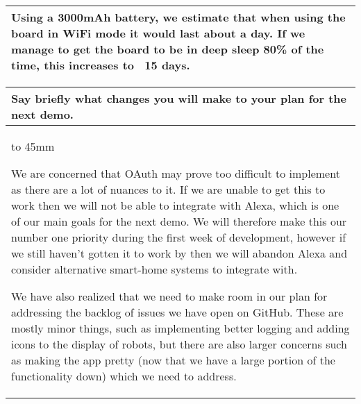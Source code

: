 \documentclass[a4paper]{article}
\newcommand{\colWidth}{141mm}
\begin{document}
\begin{center}
\begin{tabular}{|p{\colWidth}|}
{		Using a 3000mAh battery, we estimate that when using the board in WiFi mode it would last about a day.
		If we manage to get the board to be in deep sleep 80\% of the time, this increases to ~15 days.
  }
  \\
  \hline
\end{tabular}
\vskip 5mm


\begin{tabular}{|p{\colWidth}|}
	\hline
	\cellcolor{blue!25}\large
	\textbf{Say briefly what changes you will make to your plan for the next demo.}
	\\ \hline
	\vtop to 45mm{
		We are concerned that OAuth may prove too difficult to implement as there are a lot of nuances to it.
		If we are unable to get this to work then we will not be able to integrate with Alexa, which is one of
		our main goals for the next demo. We will therefore make this our number one priority during the first
		week of development, however if we still haven't gotten it to work by then we will abandon Alexa and
		consider alternative smart-home systems to integrate with.

		\vspace{2mm}

		We have also realized that we need to make room in our plan for addressing the backlog of issues we have
		open on GitHub. These are mostly minor things, such as implementing better logging and adding icons to the display of robots,
		but there are also larger concerns such as making the app pretty (now that we have a large portion of the functionality down)
		which we need to address.
  	}
  \\
  \hline
\end{tabular}

\end{center}
  
\end{document}
